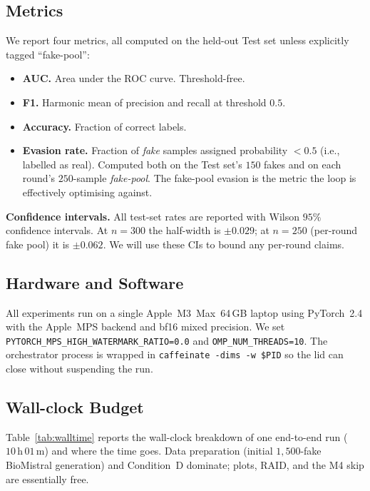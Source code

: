 \subsection{Metrics}
\label{ssec:metrics}
We report four metrics, all computed on the held-out Test set unless
explicitly tagged ``fake-pool'':

\begin{itemize}[leftmargin=*]
\item \textbf{AUC.} Area under the ROC curve. Threshold-free.
\item \textbf{F1.} Harmonic mean of precision and recall at threshold
  \(0.5\).
\item \textbf{Accuracy.} Fraction of correct labels.
\item \textbf{Evasion rate.} Fraction of \emph{fake} samples assigned
  probability $< 0.5$ (i.e., labelled as real). Computed both on the
  Test set's \(150\) fakes and on each round's \(250\)-sample
  \emph{fake-pool}. The fake-pool evasion is the metric the loop is
  effectively optimising against.
\end{itemize}

\textbf{Confidence intervals.} All test-set rates are reported with Wilson
\(95\%\) confidence intervals. At \(n=300\) the half-width is
\(\pm 0.029\); at \(n=250\) (per-round fake pool) it is \(\pm 0.062\).
We will use these CIs to bound any per-round claims.

\subsection{Hardware and Software}
\label{ssec:hardware}
All experiments run on a single Apple~M3~Max~64\,GB laptop using
PyTorch~2.4 with the Apple~MPS backend and bf16 mixed precision. We set
\texttt{PYTORCH\_MPS\_HIGH\_WATERMARK\_RATIO=0.0} and
\texttt{OMP\_NUM\_THREADS=10}. The orchestrator process is wrapped in
\texttt{caffeinate -dims -w \$PID} so the lid can close without
suspending the run.

\subsection{Wall-clock Budget}
\label{ssec:walltime}
Table~\ref{tab:walltime} reports the wall-clock breakdown of one
end-to-end run (\(10\,\mathrm{h}\,01\,\mathrm{m}\)) and where the time
goes. Data preparation (initial \(1{,}500\)-fake BioMistral generation)
and Condition~D dominate; plots, RAID, and the M4 skip are essentially
free.

